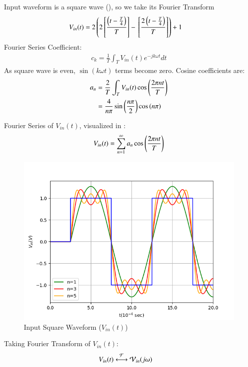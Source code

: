 \documentclass[journal,12pt,twocolumn]{IEEEtran}
\theoremstyle{remark}
\begin{document}
\solution


Input waveform is a square wave (), so we take its Fourier Transform 
\begin{align}
    V_{in}(t) &= 2\left(2{}\left[\frac{\left(t-\frac{T}{4}\right)}{T}\right] - {}\left[\frac{2\left(t - \frac{T}{4}\right)}{T}\right]\right) + 1
\end{align}
Fourier Series Coefficient:
\begin{align}
    c_k = \frac{1}{T} \int_{T} V_{in}(t)e^{-jk\omega t}dt
\end{align}
As square wave is even, $\sin(k\omega t)$ terms become zero. Cosine coefficients are:
\begin{align}
    a_n &= \frac{2}{T} \int_{T} V_{in}(t) \cos\left(\frac{2\pi nt}{T}\right)\\
    &= \frac{4}{n\pi}\sin{\ensuremath{\left(\frac{n\pi}{2}\right)}}\cos\left({n\pi}\right)
\end{align}

Fourier Series of $V_{in}(t)$, visualized in :
\begin{align}
    V_{in}(t) = \sum_{n = 1}^{\infty}a_n \cos\left(\frac{2\pi nt}{T}\right)
\end{align}

\begin{figure}[!h]
    \centering
    \includegraphics[width = \columnwidth]{figs/f_s.png}
    \caption{Input Square Waveform ($V_{in}(t)$)}
    \label{fig:square_gate.ph.23.37}
\end{figure}

Taking Fourier Transform of $V_{in}(t)$:
\begin{align}
    V_{in}(t) &\system{F} \mathcal{V}_{in}(j\omega)
\end{align}
\end{document}
